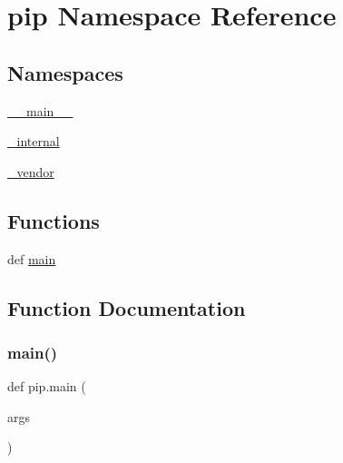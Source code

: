 \hypertarget{namespacepip}{}\section{pip Namespace Reference}
\label{namespacepip}
\subsection*{Namespaces}
\begin{DoxyCompactItemize}
\item 
 \hyperlink{namespacepip_1_1____main____}{\+\_\+\+\_\+main\+\_\+\+\_\+}
\item 
 \hyperlink{namespacepip_1_1__internal}{\+\_\+internal}
\item 
 \hyperlink{namespacepip_1_1__vendor}{\+\_\+vendor}
\end{DoxyCompactItemize}
\subsection*{Functions}
\begin{DoxyCompactItemize}
\item 
def \hyperlink{namespacepip_ad49f7f8d9e43e00081ef2ee8501ecd99}{main}
\end{DoxyCompactItemize}


\subsection{Function Documentation}
\mbox{\label{namespacepip_ad49f7f8d9e43e00081ef2ee8501ecd99}} 
\subsubsection{\texorpdfstring{main()}{main()}}
{\footnotesize\ttfamily def pip.\+main (\begin{DoxyParamCaption}\item[{}]{args }\end{DoxyParamCaption})}

